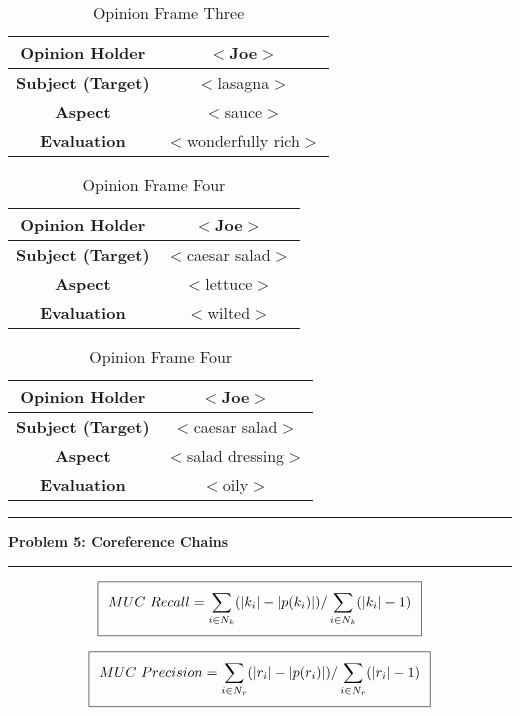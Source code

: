 \documentclass[11pt]{article}
\newcommand\question[2]{\vspace{.25in}\hrule\textbf{#1: #2}\vspace{.5em}\hrule\vspace{.10in}}
\begin{document}
 \begin{table}[H]
\centering
{\renewcommand{\arraystretch}{1.2}%
\begin{tabular}{| c | c |}
\hline
\textbf{Opinion Holder} & $<$Joe$>$\\ \hline
\textbf{Subject (Target)} & $<$lasagna$>$ \\ \hline
\textbf{Aspect} & $<$sauce$>$ \\ \hline
\textbf{Evaluation} & $<$wonderfully rich$>$ \\ \hline
\end{tabular}}
\caption{Opinion Frame Three}
\end{table}

 \begin{table}[H]
\centering
{\renewcommand{\arraystretch}{1.2}%
\begin{tabular}{| c | c |}
\hline
\textbf{Opinion Holder} & $<$Joe$>$\\ \hline
\textbf{Subject (Target)} & $<$caesar salad$>$ \\ \hline
\textbf{Aspect} & $<$lettuce$>$ \\ \hline
\textbf{Evaluation} & $<$wilted$>$ \\ \hline
\end{tabular}}
\caption{Opinion Frame Four}
\end{table}

\begin{table}[H]
\centering
{\renewcommand{\arraystretch}{1.2}%
\begin{tabular}{| c | c |}
\hline
\textbf{Opinion Holder} & $<$Joe$>$\\ \hline
\textbf{Subject (Target)} & $<$caesar salad$>$ \\ \hline
\textbf{Aspect} & $<$salad dressing$>$ \\ \hline
\textbf{Evaluation} & $<$oily$>$ \\ \hline
\end{tabular}}
\caption{Opinion Frame Four}
\end{table}


\question{Problem 5}{Coreference Chains}

\begin{equation}
\setlength\fboxsep{0.25cm}
\setlength\fboxrule{0.4pt}
\boxed{MUC \ Recall = \sum_{i \in N_k} ( \vert k_i \vert - \vert p(k_i) \vert ) / \sum_{i \in N_k} ( \vert k_i \vert - 1)}
\end{equation}

\begin{equation}
\setlength\fboxsep{0.25cm}
\setlength\fboxrule{0.4pt}
\boxed{MUC \ Precision = \sum_{i \in N_r} ( \vert r_i \vert - \vert p(r_i) \vert ) / \sum_{i \in N_r} ( \vert r_i \vert - 1)}
\end{equation}
\end{document}
